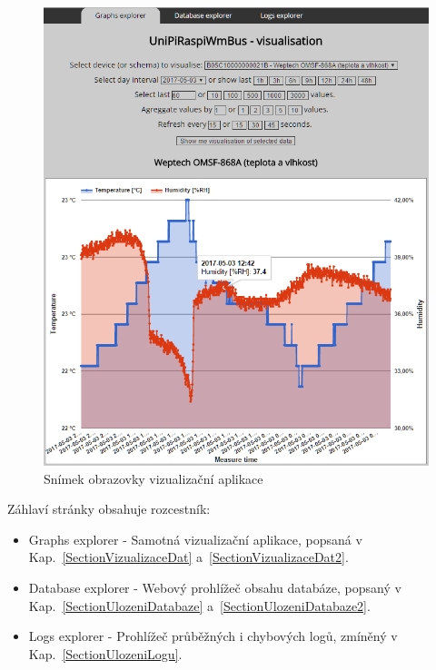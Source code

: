  \begin{figure}[!ht]
  \begin{center}
    \includegraphics[scale=0.8]{obrazky/aplikace_vizualizace}
  \end{center}
	\vspace{-10pt}
	\caption{Snímek obrazovky vizualizační aplikace}
	\label{SectionVisualizaceDat}
\end{figure}
	\vspace{-10pt}
Záhlaví stránky obsahuje rozcestník:
\begin{itemize}
	\item Graphs explorer - Samotná vizualizační aplikace, popsaná v Kap.~\ref{SectionVizualizaceDat} a~\ref{SectionVizualizaceDat2}.
	\item Database explorer - Webový prohlížeč obsahu databáze, popsaný v Kap.~\ref{SectionUlozeniDatabaze} a~\ref{SectionUlozeniDatabaze2}.
	\item Logs explorer - Prohlížeč průběžných i chybových logů, zmíněný v Kap.~\ref{SectionUlozeniLogu}.
\end{itemize}

